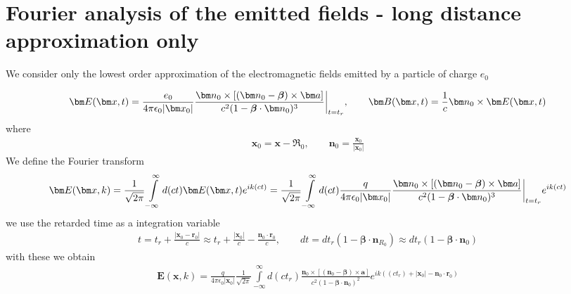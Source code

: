 

\section{Fourier analysis of the emitted fields - long distance approximation only}

We consider only the lowest order approximation of the electromagnetic fields emitted by a particle of charge $e_0$

\begin{align}
    {\bm E}({\bm x},t)={\frac{e_0}{4\pi\epsilon_0|{\bm x}_0|}\frac{{\bm n}_{0}\times[({\bm n}_{0}-{\boldsymbol\beta})\times {\bm a}]}{c^2(1-{\boldsymbol\beta}\cdot{\bm n}_{0})^3}\,\vline}_{\,t=t_r},\qquad {\bm B}({\bm x},t) = \frac1c{\bm n}_0\times{\bm E}({\bm x},t)
\end{align}
where
\begin{align}
    {\bm x}_0={\bm x}-{\boldsymbol{\mathfrak{R}}}_0,\qquad {\bm n}_0=\frac{{\bm x}_0}{|{\bm x}_0|}
\end{align}
We define the Fourier transform
\begin{align}
    {\bm E}({\bm x},k) = \frac1{\sqrt{2\pi}}\int\limits_{-\infty}^{\infty} d (ct) {\bm E}({\bm x},t)e^{ik  (ct)}=\frac1{\sqrt{2\pi}}\int\limits_{-\infty}^{\infty} d (ct) {\frac{q}{4\pi\epsilon_0|{\bm x}_0|}\frac{{\bm n}_{0}\times[({\bm n}_{0}-{\boldsymbol\beta})\times {\bm a}]}{c^2(1-{\boldsymbol\beta}\cdot{\bm n}_{0})^3}\,\vline}_{\,t=t_r}e^{ik(ct)}
\end{align}
we use the retarded time as a integration variable
\begin{align}
    t=t_r+\frac{|{\bm x}_0-{\bm r}_0|}c\approx t_r+\frac{|{\bm x}_0|}c-\frac{{\bm n}_0\cdot{\bm r}_0}c,\qquad dt=dt_r(1-{\boldsymbol{\beta}}\cdot{\bm n}_{R_0})\approx dt_r(1-{\boldsymbol{\beta}}\cdot{\bm n}_0)
\end{align}
with these we obtain
\begin{align}
    {\bm E}({\bm x},k) = \frac{q}{4\pi\epsilon_0|{\bm x}_0|}\frac1{\sqrt{2\pi}}\int\limits_{-\infty}^{\infty}d(ct_r) \frac{{\bm n}_{0}\times[({\bm n}_{0}-{\boldsymbol\beta})\times {\bm a}]}{c^2(1-{\boldsymbol\beta}\cdot{\bm n}_{0})^2}e^{ik((ct_r)+|{\bm x}_0|-{\bm n}_0\cdot{\bm r}_0)}
\end{align}

